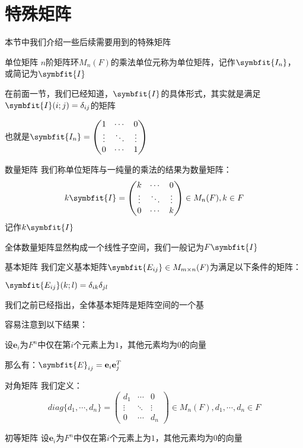 \documentclass[12pt, a4paper, oneside, UTF8]{ctexbook}
\begin{document}
	\section{特殊矩阵}
		本节中我们介绍一些后续需要用到的特殊矩阵
		\begin{para}{0}
				\begin{defn}{单位矩阵}{}
					$n$阶矩阵环$M_n(F)$的乘法单位元称为单位矩阵，记作$\symbfit{I_n}$，或简记为$\symbfit{I}$
				\end{defn}
				在前面一节，我们已经知道，$\symbfit{I}$的具体形式，其实就是满足$\symbfit{I}(i;j)=\delta_{ij}$的矩阵

				也就是$\symbfit{I_n}=\begin{pmatrix}
					1 & \cdots & 0 \\
					\vdots & \ddots & \vdots \\
					0 & \cdots & 1
				\end{pmatrix}$
				\begin{defn}{数量矩阵}{}
					我们称单位矩阵与一纯量的乘法的结果为数量矩阵：
					\begin{equation}
						k\symbfit{I}=\begin{pmatrix}
						k & \cdots & 0 \\
						\vdots & \ddots & \vdots \\
						0 & \cdots & k
						\end{pmatrix} \in M_n(F),k \in F
					\end{equation}
					记作$k\symbfit{I}$
				\end{defn}
				全体数量矩阵显然构成一个线性子空间，我们一般记为$F\symbfit{I}$
				\begin{defn}{基本矩阵}{}
					我们定义基本矩阵$\symbfit{E_{ij}} \in M_{m \times n}(F)$为满足以下条件的矩阵：
					
					$\symbfit{E_{ij}}(k;l)=\delta_{ik}\delta_{jl}$
				\end{defn}
				我们之前已经指出，全体基本矩阵是矩阵空间的一个基

				容易注意到以下结果：
				\begin{proposition}
					设$\mathbf{e}_i$为$F^n$中仅在第$i$个元素上为$1$，其他元素均为$0$的向量

					那么有：$\symbfit{E}_{ij} = \mathbf{e}_i \mathbf{e}_j^T$
				\end{proposition}
				\begin{defn}{对角矩阵}{}
					我们定义：
					\begin{equation}
						diag\{d_1,\cdots,d_n\}=\begin{pmatrix}
							d_1 & \cdots & 0 \\
							\vdots & \ddots & \vdots \\
							0 & \cdots & d_n 
						\end{pmatrix} \in M_n(F),d_1,\cdots,d_n \in F
					\end{equation}
				\end{defn} 
				\begin{defn}{初等矩阵}{}
					设$\mathbf{e}_i$为$F^n$中仅在第$i$个元素上为$1$，其他元素均为$0$的向量


\end{defn}
\end{para}
\end{document}
